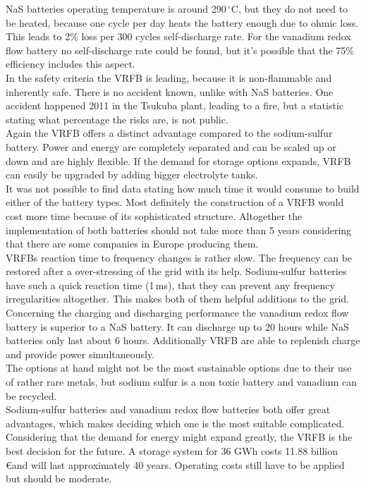 \documentclass[12pt,a4paper]{article}
\begin{document}
\begin{parcolumns}[colwidths={1=2.5 cm, 2=10 cm, 3=2.5cm}]{3}
{NaS batteries operating temperature is around 290\,$^\circ$C, but they do not need to be heated, because one cycle per day heats the battery enough due to ohmic loss. This leads to 2$\%$ loss per 300 cycles self-discharge rate. For the vanadium redox flow battery no self-discharge rate could be found, but it's possible that the 75$\%$ efficiency includes this aspect.\\
In the safety criteria the VRFB is leading, because it is non-flammable and inherently safe. There is no accident known, unlike with NaS batteries. One accident happened 2011 in the Tsukuba plant, leading to a fire, but a statistic stating what percentage the risks are, is not public. \\
Again the VRFB offers a distinct advantage compared to the sodium-sulfur battery. Power and energy are completely separated and can be scaled up or down and are highly flexible. If the demand for storage options expands, VRFB can easily be upgraded by adding bigger electrolyte tanks.\\
It was not possible to find data stating how much time it would consume to build either of the battery types. Most definitely the construction of a VRFB would cost more time because of its sophisticated structure. Altogether the implementation of both batteries should not take more than 5 years considering that there are some companies in Europe producing them.\\
VRFBs reaction time to frequency changes is rather slow. The frequency can be restored after a over-stressing of the grid with its help. Sodium-sulfur batteries have such a quick reaction time (1\,ms), that they can prevent any frequency irregularities altogether. This makes both of them helpful additions to the grid. Concerning the charging and discharging performance the vanadium redox flow battery is superior to a NaS battery. It can discharge up to 20 hours while NaS batteries only last about 6 hours. Additionally VRFB are able to replenish charge and provide power simultaneously.\\ 
The options at hand might not be the most sustainable options due to their use of rather rare metals, but sodium sulfur is a non toxic battery and vanadium can be recycled.\\
Sodium-sulfur batteries and vanadium redox flow batteries both offer great advantages, which makes deciding which one is the most suitable complicated. Considering that the demand for energy might expand greatly, the VRFB is the best decision for the future. A storage system for 36 GWh costs 11.88 billion \euro and will last approximately  40 years. Operating costs still have to be applied but should be moderate.\\
}
\end{parcolumns}
\end{document}
